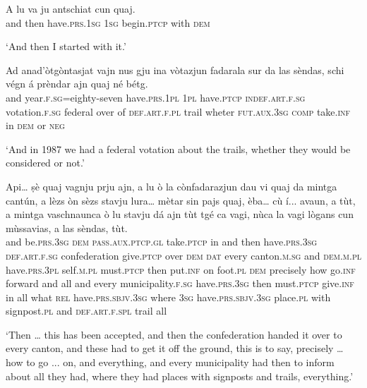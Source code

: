 \begin{linenumbers}
\gll  A lu va ju antschiat cun quaj.  \\
and then have.\textsc{prs.1sg} \textsc{1sg} begin.\textsc{ptcp} with \textsc{dem}\\
\end{linenumbers}
\medskip
\glt `And then I started with it.'
\medskip

\begin{linenumbers}
\gll Ad anad’òtgòntasjat vajn nus gju ina vòtazjun fadarala sur da las sèndas, schi végn á prèndar ajn quaj né bétg.   \\
and year.\textsc{f.sg=}eighty-seven have.\textsc{prs.1pl} \textsc{1pl} have.\textsc{ptcp} \textsc{indef.art.f.sg} votation.\textsc{f.sg} federal over of \textsc{def.art.f.pl} trail wheter \textsc{fut.aux.3sg} \textsc{comp} take.\textsc{inf} in \textsc{dem} or \textsc{neg}  \\
\end{linenumbers}
\medskip
\glt `And in 1987 we had a federal votation about the trails, whether they would be considered or not.'
\medskip

\begin{linenumbers}
\gll Api… ṣè quaj vagnju prju ajn, a lu ò la cònfadarazjun dau vi quaj da mintga cantún, a lèzs òn sèzs stavju lura… mètar sin pajs quaj, èba… cù í... avaun, a tùt, a mintga vaschnaunca ò lu stavju dá ajn tùt tgé ca vagi, nùca la vagi lògans cun mùssavias, a las sèndas, tùt.   \\
and be.\textsc{prs.3sg} \textsc{dem} \textsc{pass.aux.ptcp.gl} take.\textsc{ptcp} in and then have.\textsc{prs.3sg} \textsc{def.art.f.sg} confederation give.\textsc{ptcp} over \textsc{dem} \textsc{dat} every canton.\textsc{m.sg} and \textsc{dem.m.pl} have.\textsc{prs.3pl} self.\textsc{m.pl} must.\textsc{ptcp} then put.\textsc{inf} on foot.\textsc{pl} \textsc{dem} precisely  how go.\textsc{inf} forward and all and every municipality.\textsc{f.sg} have.\textsc{prs.3sg} then must.\textsc{ptcp} give.\textsc{inf} in all what \textsc{rel} have.\textsc{prs.sbjv.3sg} where \textsc{3sg} have.\textsc{prs.sbjv.3sg} place.\textsc{pl} with signpost.\textsc{pl} and \textsc{def.art.f.spl} trail all \\
\end{linenumbers}
\medskip
\glt `Then … this has been accepted, and then the confederation handed it over to every canton, and these had to get it off the ground, this is to say, precisely … how to go ... on, and everything, and every municipality had then to inform about all they had, where they had places with signposts and trails, everything.'
\medskip


